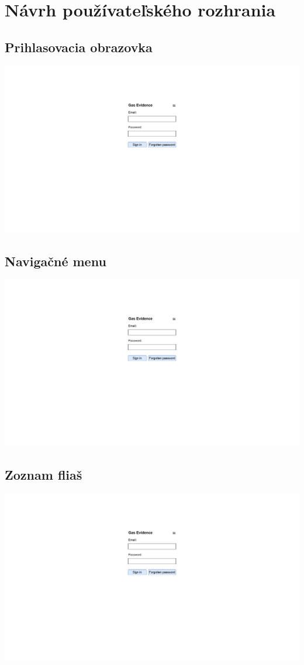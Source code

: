 \documentclass{zah}
\begin{document}
\section{Návrh používateľského rozhrania}

\subsection{Prihlasovacia obrazovka}
\begin{center}
\includegraphics[width=.7\textwidth,page=1]{navrh-assets/ui}
\end{center}

\subsection{Navigačné menu}
\begin{center}
\includegraphics[width=.7\textwidth,page=2]{navrh-assets/ui}
\end{center}

\subsection{Zoznam fliaš}
\begin{center}
\includegraphics[width=.7\textwidth,page=3]{navrh-assets/ui}
\end{center}
\end{document}
